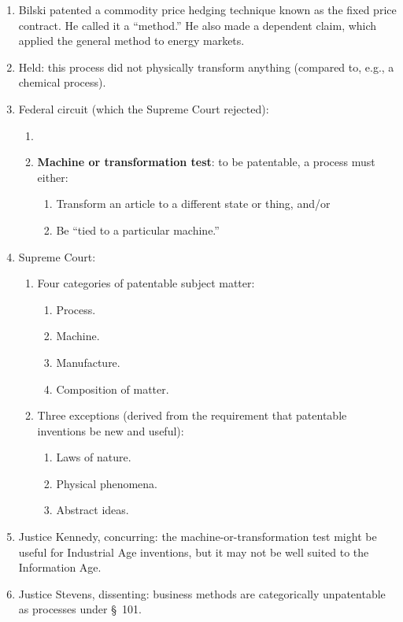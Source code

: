 \begin{enumerate}
    \item Bilski patented a commodity price hedging technique known as the fixed 
    price contract. He called it a ``method.'' He also made a dependent claim, 
    which applied the general method to energy markets.
    \item Held: this process did not physically transform anything (compared to, 
    e.g., a chemical process).
    \item Federal circuit (which the Supreme Court rejected):
    \begin{enumerate}
        \item 
        \item \textbf{Machine or transformation test}: to be patentable, a process 
        must either:
        \begin{enumerate}
            \item Transform an article to a different state or thing, and/or
            \item Be ``tied to a particular machine.''
        \end{enumerate}
    \end{enumerate}
    \item Supreme Court:
    \begin{enumerate}
        \item Four categories of patentable subject matter:
        \begin{enumerate}
            \item Process.
            \item Machine. 
            \item Manufacture.
            \item Composition of matter.
        \end{enumerate}
        \item Three exceptions (derived from the requirement that patentable 
        inventions be new and useful):
        \begin{enumerate}
            \item Laws of nature.
            \item Physical phenomena.
            \item Abstract ideas.
        \end{enumerate}
    \end{enumerate}
    \item Justice Kennedy, concurring: the machine-or-transformation test might 
    be useful for Industrial Age inventions, but it may not be well suited to 
    the Information Age.
    \item Justice Stevens, dissenting: business methods are categorically 
    unpatentable as processes under \S\ 101.
\end{enumerate}

